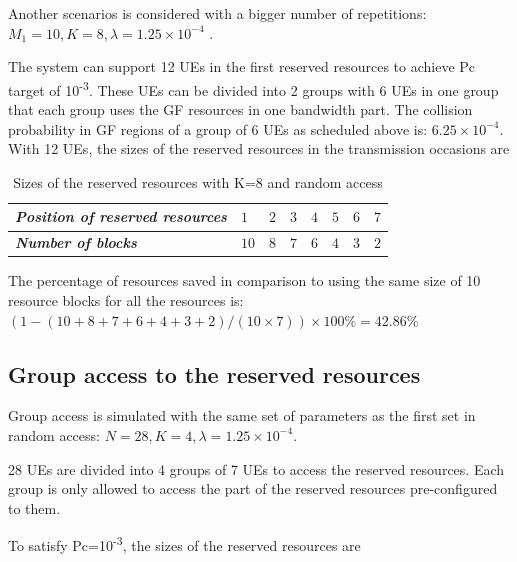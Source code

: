 \documentclass[conference]{IEEEtran}
\begin{document}
Another scenarios is considered with a bigger number of repetitions: $M_1=10, K=8, \lambda=1.25\times10^{-4}$ .

The system can support 12 UEs in the first reserved resources to achieve Pc target of 10\textsuperscript{-3}. These UEs can be divided into 2 groups with 6 UEs in one group that each group uses the GF resources in one bandwidth part. The collision probability in GF regions of a group of 6 UEs as scheduled above is: $6.25\times10^{-4}$.
With 12 UEs, the sizes of the reserved resources in the transmission occasions are

\begin{table}[htbp]
\caption{Sizes of the reserved resources with K=8 and random access}
\begin{center}
\begin{tabular}{|p{5em}|p{2em}|p{2em}|p{2em}|p{2em}|p{2em}|p{2em}|p{2em}|}
 \hline
 \textbf{\textit{Position of reserved resources}} & $1$ &$2$ &$3$ & $4$ &$5$ &$6$ &$7$\\ 
 \hline
 \textbf{\textit{Number of blocks}} & $10$ &$8$ &$7$ & $6$ &$4$ &$3$ &$2$\\

 
 \hline
\end{tabular}
\label{tab2}
\end{center}
\end{table}

The percentage of resources saved in comparison to using the same size of 10 resource blocks for all the resources is: $(1 - (10+8+7+6+4+3+2)/(10\times7)) \times100\% = 42.86\%$

\subsection{Group access to the reserved resources}\label{IIIBB}
Group access is simulated with the same set of parameters as the first set in random access: $N = 28, K = 4, \lambda = 1.25\times10^{-4}$.

28 UEs are divided into 4 groups of 7 UEs to access the reserved resources. Each group is only allowed to access the part of the reserved resources pre-configured to them. 

To satisfy Pc=10\textsuperscript{-3}, the sizes of the reserved resources are
\end{document}
